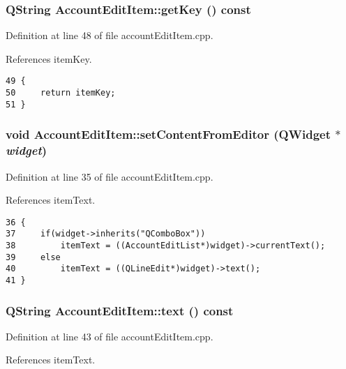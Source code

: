 \hypertarget{classAccountEditItem_a5}{
\subsubsection[getKey]{\setlength{\rightskip}{0pt plus 5cm}QString Account\-Edit\-Item::get\-Key () const}}
\label{classAccountEditItem_a5}


Definition at line 48 of file account\-Edit\-Item.cpp.

References item\-Key.

\footnotesize\begin{verbatim}49 {
50     return itemKey;
51 }
\end{verbatim}\normalsize 


\hypertarget{classAccountEditItem_a3}{
\subsubsection[setContentFromEditor]{\setlength{\rightskip}{0pt plus 5cm}void Account\-Edit\-Item::set\-Content\-From\-Editor (QWidget $\ast$ {\em widget})}}
\label{classAccountEditItem_a3}


Definition at line 35 of file account\-Edit\-Item.cpp.

References item\-Text.

\footnotesize\begin{verbatim}36 {
37     if(widget->inherits("QComboBox"))
38         itemText = ((AccountEditList*)widget)->currentText();
39     else
40         itemText = ((QLineEdit*)widget)->text();
41 }
\end{verbatim}\normalsize 


\hypertarget{classAccountEditItem_a4}{
\subsubsection[text]{\setlength{\rightskip}{0pt plus 5cm}QString Account\-Edit\-Item::text () const}}
\label{classAccountEditItem_a4}


Definition at line 43 of file account\-Edit\-Item.cpp.

References item\-Text.

